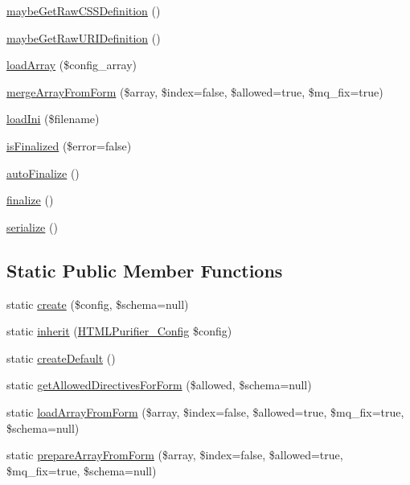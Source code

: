 \begin{DoxyCompactItemize}
\item 
\hyperlink{classHTMLPurifier__Config_a3931eb8b3952ab671ad2946ccd16c55b}{maybe\+Get\+Raw\+C\+S\+S\+Definition} ()
\item 
\hyperlink{classHTMLPurifier__Config_a66e2c78fd18baeca286ecf6728a51897}{maybe\+Get\+Raw\+U\+R\+I\+Definition} ()
\item 
\hyperlink{classHTMLPurifier__Config_a6e4ab9eb2f6a9080713bf09aa3dd3719}{load\+Array} (\$config\+\_\+array)
\item 
\hyperlink{classHTMLPurifier__Config_a8d242c24105157f5ea9a85dacea926c8}{merge\+Array\+From\+Form} (\$array, \$index=false, \$allowed=true, \$mq\+\_\+fix=true)
\item 
\hyperlink{classHTMLPurifier__Config_acf5ebf3cb8b1496c9e0c9e84738acd0d}{load\+Ini} (\$filename)
\item 
\hyperlink{classHTMLPurifier__Config_aa8b46c649747e0ceb8860cdd673ff1ac}{is\+Finalized} (\$error=false)
\item 
\hyperlink{classHTMLPurifier__Config_a8f2653854dec7eb305c547fd6f4a43dd}{auto\+Finalize} ()
\item 
\hyperlink{classHTMLPurifier__Config_a38fa0b59bebd8f820bff43e1135bce04}{finalize} ()
\item 
\hyperlink{classHTMLPurifier__Config_ab1f52da877edc9da5205921da7b4e191}{serialize} ()
\end{DoxyCompactItemize}
\subsection*{Static Public Member Functions}
\begin{DoxyCompactItemize}
\item 
static \hyperlink{classHTMLPurifier__Config_a063a082504e63d10551ec5472b2a54d9}{create} (\$config, \$schema=null)
\item 
static \hyperlink{classHTMLPurifier__Config_aa1f8206990c7a583a752abeef734cb64}{inherit} (\hyperlink{classHTMLPurifier__Config}{H\+T\+M\+L\+Purifier\+\_\+\+Config} \$config)
\item 
static \hyperlink{classHTMLPurifier__Config_a1cdaef492d3ad4ea89c38d53779c4800}{create\+Default} ()
\item 
static \hyperlink{classHTMLPurifier__Config_a48e83ac386e03419ebc3a2019710eb96}{get\+Allowed\+Directives\+For\+Form} (\$allowed, \$schema=null)
\item 
static \hyperlink{classHTMLPurifier__Config_a0c79e80b32c02aac6e404b910a178c1a}{load\+Array\+From\+Form} (\$array, \$index=false, \$allowed=true, \$mq\+\_\+fix=true, \$schema=null)
\item 
static \hyperlink{classHTMLPurifier__Config_ad9dba68ee02d1ed26be7a1371cbba5eb}{prepare\+Array\+From\+Form} (\$array, \$index=false, \$allowed=true, \$mq\+\_\+fix=true, \$schema=null)
\end{DoxyCompactItemize}
